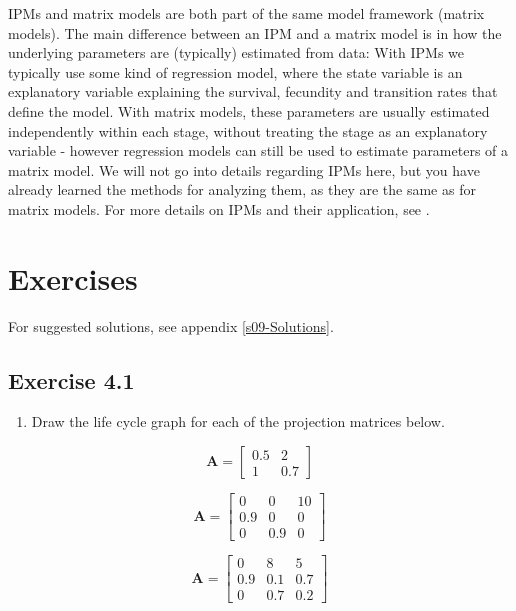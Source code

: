 \documentclass[
]{book}
\providecommand{\tightlist}{%
  \setlength{\itemsep}{0pt}\setlength{\parskip}{0pt}}
\begin{document}
IPMs and matrix models are both part of the same model framework (matrix models). The main difference between an IPM and a matrix model is in how the underlying parameters are (typically) estimated from data: With IPMs we typically use some kind of regression model, where the state variable is an explanatory variable explaining the survival, fecundity and transition rates that define the model. With matrix models, these parameters are usually estimated independently within each stage, without treating the stage as an explanatory variable - however regression models can still be used to estimate parameters of a matrix model. We will not go into details regarding IPMs here, but you have already learned the methods for analyzing them, as they are the same as for matrix models. For more details on IPMs and their application, see \citet{Ellner5}.

\hypertarget{exercises-3}{%
\section{Exercises}\label{exercises-3}}

For suggested solutions, see appendix \ref{s09-Solutions}.

\hypertarget{exercise-4.1}{%
\subsection*{Exercise 4.1}\label{exercise-4.1}}

\begin{enumerate}
\def\labelenumi{\arabic{enumi}.}
\tightlist
\item
  Draw the life cycle graph for each of the projection matrices below.
\end{enumerate}

\[\mathbf{A}=\left[\begin{matrix}0.5&2\\1&0.7\end{matrix}\right]\]

\[\mathbf{A}=\left[\begin{matrix}0&0&10\\0.9&0&0\\0&0.9&0\end{matrix}\right]\]

\[\mathbf{A}=\left[\begin{matrix}0&8&5\\0.9&0.1&0.7\\0&0.7&0.2\end{matrix}\right]\]
\end{document}
